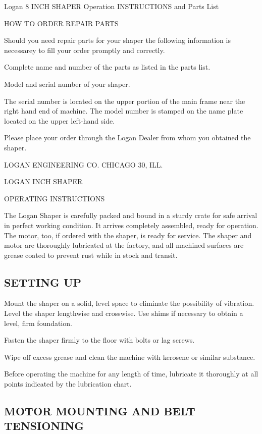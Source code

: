 \documentclass{article}
\begin{document}
Logan
8 INCH SHAPER
Operation
INSTRUCTIONS
and
Parts List

HOW TO ORDER REPAIR PARTS

Should you need repair parts for your shaper the following information
is necessarey to fill your order promptly and correctly.

Complete name and number of the parts as listed in the parts list.

Model and serial number of your shaper.

The serial number is located on the upper portion of the main frame
near the right hand end of machine.  The model number is stamped on
the name plate located on the upper left-hand side.

Please place your order through the Logan Dealer from whom you
obtained the shaper.

LOGAN ENGINEERING CO. CHICAGO 30, ILL.

\page

\picture

LOGAN INCH SHAPER

\page

OPERATING INSTRUCTIONS

The Logan Shaper is carefully packed and bound in a sturdy crate for
safe arrival in perfect working condition.  It arrives completely
assembled, ready for operation.  The motor, too, if ordered with the
shaper, is ready for service.  The shaper and motor are thoroughly
lubricated at the factory, and all machined surfaces are grease coated
to prevent rust while in stock and transit.

\subsection{SETTING UP}

Mount the shaper on a solid, level space to eliminate the possibility
of vibration.  Level the shaper lengthwise and crosswise.  Use shims
if necessary to obtain a level, firm foundation.

Fasten the shaper firmly to the floor with bolts or lag screws.

Wipe off excess grease and clean the machine with kerosene or similar
substance.

Before operating the machine for any length of time, lubricate it
thoroughly at all points indicated by the lubrication chart.

\subsection{MOTOR MOUNTING AND BELT TENSIONING}
\end{document}
